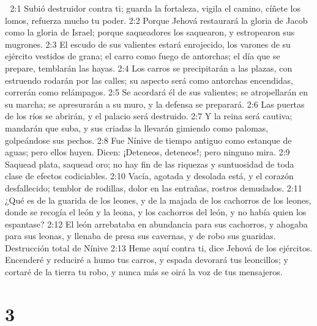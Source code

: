 
2:1 Subió destruidor contra ti; guarda la fortaleza, vigila el camino, cíñete los lomos, refuerza mucho tu poder.  
2:2 Porque Jehová restaurará la gloria de Jacob como la gloria de Israel; porque saqueadores los saquearon, y estropearon sus mugrones.  
2:3 El escudo de sus valientes estará enrojecido, los varones de su ejército vestidos de grana; el carro como fuego de antorchas; el día que se prepare, temblarán las hayas.  
2:4 Los carros se precipitarán a las plazas, con estruendo rodarán por las calles; su aspecto será como antorchas encendidas, correrán como relámpagos.  
2:5 Se acordará él de sus valientes; se atropellarán en su marcha; se apresurarán a su muro, y la defensa se preparará.  
2:6 Las puertas de los ríos se abrirán, y el palacio será destruido.  
2:7 Y la reina será cautiva; mandarán que suba, y sus criadas la llevarán gimiendo como palomas, golpeándose sus pechos.  
2:8 Fue Nínive de tiempo antiguo como estanque de aguas; pero ellos huyen. Dicen: ¡Deteneos, deteneos!; pero ninguno mira.  
2:9 Saquead plata, saquead oro; no hay fin de las riquezas y suntuosidad de toda clase de efectos codiciables.  
2:10 Vacía, agotada y desolada está, y el corazón desfallecido; temblor de rodillas, dolor en las entrañas, rostros demudados.  
2:11 ¿Qué es de la guarida de los leones, y de la majada de los cachorros de los leones, donde se recogía el león y la leona, y los cachorros del león, y no había quien los espantase?  
2:12 El león arrebataba en abundancia para sus cachorros, y ahogaba para sus leonas, y llenaba de presa sus cavernas, y de robo sus guaridas.  
Destrucción total de Nínive  
2:13 Heme aquí contra ti, dice Jehová de los ejércitos. Encenderé y reduciré a humo tus carros, y espada devorará tus leoncillos; y cortaré de la tierra tu robo, y nunca más se oirá la voz de tus mensajeros.  

\chapter{3}

